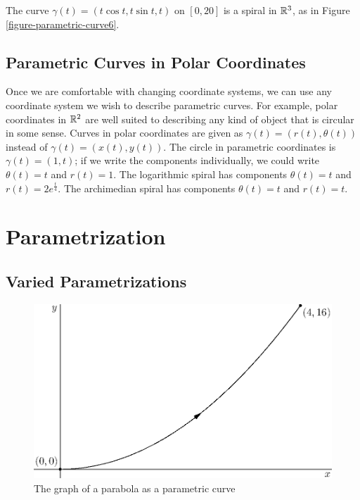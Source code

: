 \documentclass[fleqn,letterpaper]{report}
\begin{document}
\begin{example}
The curve $\gamma(t) = (t\cos t, t\sin t,t)$ on $[0,20]$ is a
spiral in $\mathbb{R}^3$, as in Figure \ref{figure-parametric-curve6}.
\end{example}

\subsection{Parametric Curves in Polar Coordinates}
\label{parametric-curves-polar-coordinates}

Once we are comfortable with changing coordinate systems, we can
use any coordinate system we wish to describe parametric curves.
For example, polar coordinates in $\mathbb{R}^2$ are well suited to
describing any kind of object that is circular in some
sense. Curves in polar coordinates are given as $\gamma(t) =
(r(t), \theta(t))$ instead of $\gamma(t) = (x(t),y(t))$. The
circle in parametric coordinates is $\gamma(t) = (1, t)$; if
we write the components individually, we could write 
$\theta(t) = t$ and $r(t) = 1$. The logarithmic spiral has
components $\theta(t) = t$ and $r(t) = 2e^{\frac{t}{4}}$. The
archimedian spiral has components $\theta(t) = t$ and $r(t) = t$.

\section{Parametrization}
\label{parametrization}

\subsection{Varied Parametrizations}
\label{varied-parametrization}

\begin{figure}[t]
\centering
\includegraphics[width=12cm]{figure17.eps}
\caption{The graph of a parabola as a parametric curve}
\label{figure-parametric-parabola}
\end{figure} 
\end{document}

